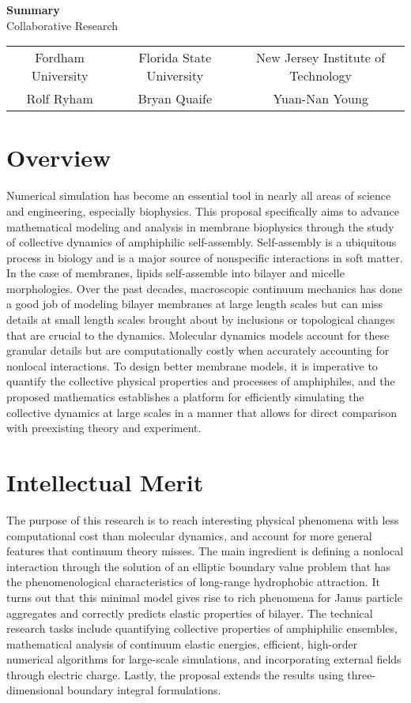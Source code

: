 \documentclass{article}
\begin{document}
\begin{center}
{\bf \Large Summary}\\ Collaborative Research
\begin{tabular}{ccc}\\ 
Fordham University & Florida State University& New Jersey Institute of Technology\\
Rolf Ryham &            Bryan Quaife &              Yuan-Nan Young
\end{tabular}

\end{center}

\section*{Overview}
Numerical simulation has become an essential tool in nearly all areas of science and engineering, especially biophysics. This proposal specifically aims to advance mathematical modeling and analysis in membrane biophysics through the study of
collective dynamics of amphiphilic self-assembly. Self-assembly is a ubiquitous process in biology and is a major source of 
nonspecific interactions in soft matter. In the case of membranes, lipids self-assemble into bilayer and micelle morphologies. Over the past decades, macroscopic continuum mechanics has done a good job of modeling bilayer membranes at large length scales but can miss details at small length scales brought about by inclusions or topological changes that are crucial to the dynamics. Molecular dynamics models account for these granular details but are computationally costly when accurately accounting for nonlocal interactions. To design better membrane models, it is imperative to quantify the collective physical properties and processes of amphiphiles, and the proposed mathematics establishes a platform for efficiently simulating the collective dynamics at large scales in a manner that allows for direct comparison with preexisting theory and experiment.

\section*{Intellectual Merit}
The purpose of this research is to reach interesting physical phenomena with 
less computational cost than molecular dynamics, and account for more general
features that continuum theory misses. The main ingredient is defining a 
nonlocal interaction through the solution of an elliptic boundary value problem
that has the phenomenological characteristics of long-range hydrophobic
attraction. It turns out that this minimal model gives rise to rich phenomena
for Janus particle aggregates and correctly predicts elastic properties of bilayer. 
The technical research tasks include quantifying collective properties of 
amphiphilic ensembles, mathematical analysis of continuum elastic energies, 
efficient, high-order numerical algorithms for large-scale simulations, and 
incorporating external fields through electric charge. Lastly, the proposal 
extends the results using three-dimensional boundary integral formulations.
\end{document}
